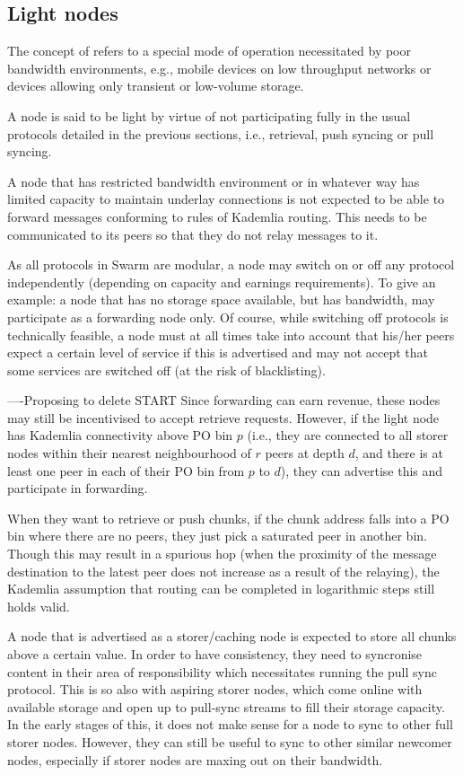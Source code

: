 \subsection{Light nodes}
\label{sec:light}

The concept of  refers to a special mode of operation necessitated by poor bandwidth environments, e.g., mobile devices on low throughput networks or devices allowing only transient or low-volume storage.

A node is said to be light by virtue of not participating fully in the usual protocols detailed in the previous sections, i.e., retrieval, push syncing or pull syncing. 

A node that has restricted bandwidth environment or in whatever way has limited capacity  to maintain underlay connections is not expected to be able to forward messages conforming to rules of Kademlia routing. This needs to be communicated to its peers so that they do not relay messages to it. 

As all protocols in Swarm are modular, a node may switch on or off any protocol independently (depending on capacity and earnings requirements). To give an example: a node that has no storage space available, but has bandwidth, may participate as a forwarding node only. Of course, while switching off protocols is technically feasible, a node must at all times take into account that his/her peers expect a certain level of service if this is advertised and may not accept that some services are switched off (at the risk of blacklisting). 

----Proposing to delete START
Since forwarding can earn revenue, these nodes may still be incentivised to accept retrieve requests. However, if the light node has Kademlia connectivity above PO bin $p$ (i.e., they  are connected to all storer nodes within their nearest neighbourhood of $r$ peers at depth   $d$, and there is at least one peer in each of their PO bin from $p$ to $d$), they can advertise this and participate in forwarding. 

When they want to retrieve or push chunks, if the chunk address falls into a PO bin where there are no peers, they just pick a saturated peer in another bin. Though this may result in a spurious hop (when the proximity of the message  destination to the latest peer does not increase as a result of the relaying), the Kademlia assumption that routing can be completed in logarithmic steps still holds valid.

A node that is advertised as a storer/caching node is expected to store all chunks  above a certain value. In order to have consistency, they need to syncronise content in their area of responsibility which necessitates running the pull sync protocol. This is so also with aspiring storer nodes, which come online with available storage and open up to pull-sync streams to fill their storage capacity. In the early stages of this, it does not make sense for a node to sync to other full storer nodes. However, they can still be useful to sync to other similar newcomer nodes, especially if storer nodes are maxing out on their bandwidth.

